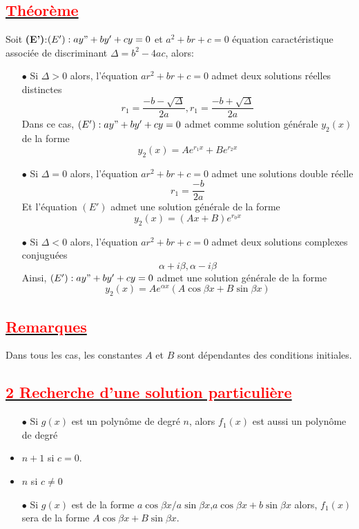 \documentclass[12pt]{article}
\begin{document}
\subsection*{\underline{\textbf{\textcolor{red}{Théorème}}}}
Soit \textbf{(E')}:$(E'):ay"+by'+cy=0$ et $a^{2}+br+c=0$ équation caractéristique associée de discriminant $\Delta=b^{2}-4ac$, alors:
\begin{itemize}
    \item[$\bullet$] Si $\Delta >0$ alors, l'équation $ar^{2}+br+c=0$ admet deux solutions réelles distinctes \[r_{1}=\frac{-b-\sqrt{\Delta}}{2a}, r_{1}=\frac{-b+\sqrt{\Delta}}{2a}\]
    Dans ce cas, $(E'):ay"+by'+cy=0$ admet comme solution générale $y_{2}(x)$ de la forme\\
    \[y_{2}(x)=Ae^{r_{1}x}+Be^{r_{2}x}\]
    \item[$\bullet$] Si $\Delta = 0$ alors, l'équation $ar^{2}+br+c=0$ admet une solutions double réelle \[r_{1}=\frac{-b}{2a}\]
    Et l'équation $(E')$ admet une solution générale de la forme 
    \[y_{2}(x)=(Ax+B)e^{r_{0}x}\]
    \item[$\bullet$] Si $\Delta <0$ alors, l'équation $ar^{2}+br+c=0$ admet deux solutions complexes conjuguées \[\alpha + i\beta, \alpha - i\beta\]
    Ainsi, $(E'):ay"+by'+cy=0$ admet une solution générale de la forme 
    \[y_{2}(x)=Ae^{\alpha x}(A\cos \beta x+B\sin \beta x) \]
\end{itemize}
\subsection*{\underline{\textbf{\textcolor{red}{Remarques}}}}
Dans tous les cas, les constantes $A$ et $B$ sont dépendantes des conditions initiales.
\subsection*{\underline{\textbf{\textcolor{red}{2 Recherche d'une solution particulière}}}}
\begin{itemize}
    \item[$\bullet$ ] Si $g(x)$ est un polynôme de degré $n$, alors $f_{1}(x)$ est aussi un polynôme de degré
    \item $n+1$ si $c=0$.
    \item $n$ si $c\neq 0$
    \item[$\bullet$ ] Si $g(x)$ est de la forme \( a\cos \beta x / a\sin \beta x \),\( a\cos \beta x + b\sin \beta x \) alors, $f_{1}(x)$ sera de la forme \( A\cos \beta x + B\sin \beta x \).
\end{itemize}
\end{document}
